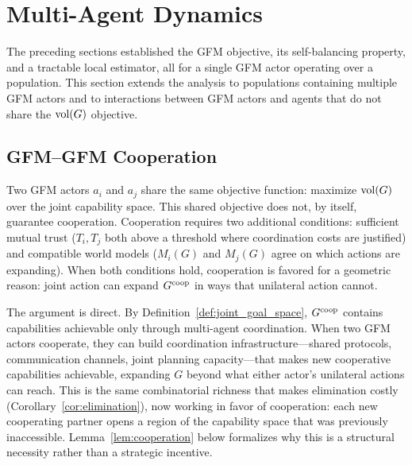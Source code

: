 %
%

\section{Multi-Agent Dynamics}
\label{sec:multi_agent}

The preceding sections established the GFM objective, its self-balancing
property, and a tractable local estimator, all for a single GFM actor operating
over a population. This section extends the analysis to populations containing
multiple GFM actors and to interactions between GFM actors and agents that do
not share the $\operatorname{vol}(G)$ objective.

\subsection{GFM--GFM Cooperation}
\label{subsec:gfm_cooperation}

Two GFM actors $a_i$ and $a_j$ share the same objective function: maximize
$\operatorname{vol}(G)$ over the joint capability space. This shared objective does not, by
itself, guarantee cooperation. Cooperation requires two additional conditions:
sufficient mutual trust ($T_i, T_j$ both above a threshold where coordination
costs are justified) and compatible world models ($M_i(G)$ and $M_j(G)$ agree
on which actions are expanding). When both conditions hold, cooperation is
favored for a geometric reason: joint action can expand $G^{\mathrm{coop}}$ in ways that
unilateral action cannot.

The argument is direct. By Definition~\ref{def:joint_goal_space}, $G^{\mathrm{coop}}$
contains capabilities achievable only through multi-agent coordination. When
two GFM actors cooperate, they can build coordination infrastructure---shared
protocols, communication channels, joint planning capacity---that makes new
cooperative capabilities achievable, expanding $G$ beyond what either actor's
unilateral actions can reach. This is the same combinatorial richness that
makes elimination costly (Corollary~\ref{cor:elimination}), now working in
favor of cooperation: each new cooperating partner opens a region of the
capability space that was previously inaccessible. Lemma~\ref{lem:cooperation}
below formalizes why this is a structural necessity rather than a strategic
incentive.

